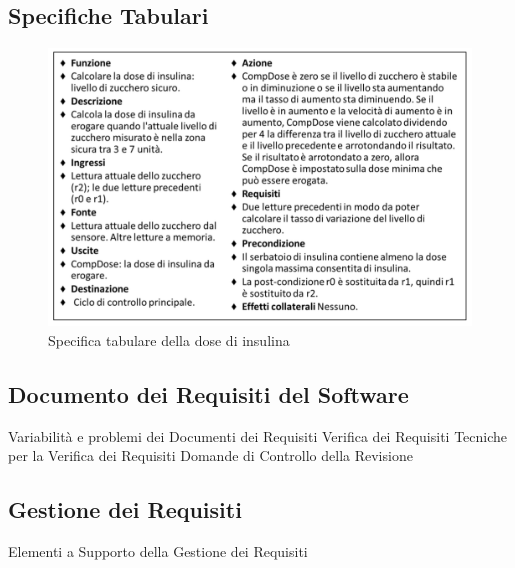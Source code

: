 \documentclass{article}
\begin{document}
	\subsection{Specifiche Tabulari}
	\begin{figure}[h]
		\centering
		\includegraphics[scale=0.3]{16.spec_tab_ins.png}
		\caption{Specifica tabulare della dose di insulina}
		\label{fig:im-16}
	\end{figure}
	\subsection{Documento dei Requisiti del Software}
	Variabilità e problemi dei Documenti dei Requisiti
	Verifica dei Requisiti
	Tecniche per la Verifica dei Requisiti
	Domande di Controllo della Revisione
	\subsection{Gestione dei Requisiti}
	Elementi a Supporto della Gestione dei Requisiti
\end{document}

